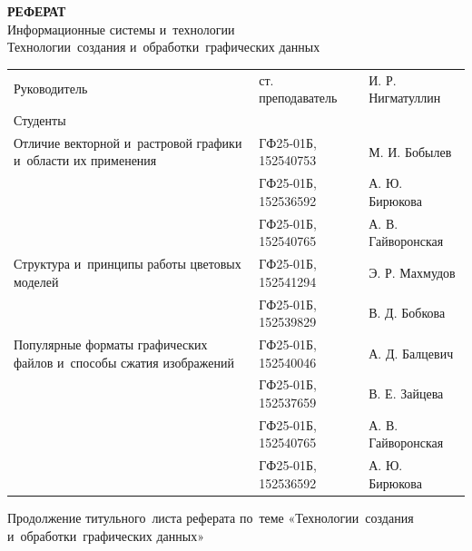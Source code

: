 \documentclass{ou}
\begin{document}
\thispagestyle{empty}
\begin{center}
\shortstack{\FGAVO}\vspace{4\baselineskip}
\textbf{РЕФЕРАТ}\\
Информационные системы и~технологии\\
Технологии~создания и~обработки~графических данных\vspace{2\baselineskip}\end{center}
\begin{flushleft}
\doublespacing
\begin{tabularx}{\textwidth}{@{} p{} l l @{}}
Руководитель & ст. преподаватель & И. Р. Нигматуллин\\
Студенты     &                   &                  \\
\multirow{-2.27}{\hsize}{\singlespacing Отличие векторной и~растровой графики и~области их применения}
             & ГФ25-01Б, 152540753 & М. И. Бобылев\\
             & ГФ25-01Б, 152536592 & А. Ю. Бирюкова\\
             & ГФ25-01Б, 152540765 & А. В. Гайворонская\\
\multirow{-2.27}{\hsize}{\singlespacing Структура и~принципы работы цветовых моделей}
             & ГФ25-01Б, 152541294 & Э. Р. Махмудов\\
             & ГФ25-01Б, 152539829 & В. Д. Бобкова\\
\multirow{-2.27}{\hsize}{\singlespacing Популярные форматы графических файлов и~способы сжатия изображений}
             & ГФ25-01Б, 152540046 & А. Д. Балцевич\\
             & ГФ25-01Б, 152537659 & В. Е. Зайцева\\
             & ГФ25-01Б, 152540765 & А. В. Гайворонская\\
             & ГФ25-01Б, 152536592 & А. Ю. Бирюкова\\
\end{tabularx}
\end{flushleft}
\vspace*{\fill}
\begin{center}
\city
\end{center}
\newpage
\thispagestyle{empty}
Продолжение титульного~листа реферата по~теме «Технологии~создания\\и~обработки~графических данных»
\end{document}

